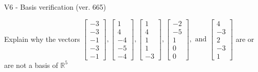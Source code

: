 \begin{exercise}
  \begin{exerciseTitle}V6 - Basis verification (ver. 665)\end{exerciseTitle}
  \begin{exerciseStatement}
    Explain why the vectors \(\left[\begin{array}{r}
-3 \\
-3 \\
-1 \\
-3 \\
-1
\end{array}\right] , \left[\begin{array}{r}
1 \\
4 \\
-4 \\
-5 \\
-4
\end{array}\right] , \left[\begin{array}{r}
1 \\
4 \\
1 \\
1 \\
-3
\end{array}\right] , \left[\begin{array}{r}
-2 \\
-5 \\
1 \\
0 \\
0
\end{array}\right] , \text{ and } \left[\begin{array}{r}
4 \\
-3 \\
2 \\
-3 \\
1
\end{array}\right]\) are or are not a basis of \(\mathbb{R}^5\)	



\end{exerciseStatement}
\end{exercise}
